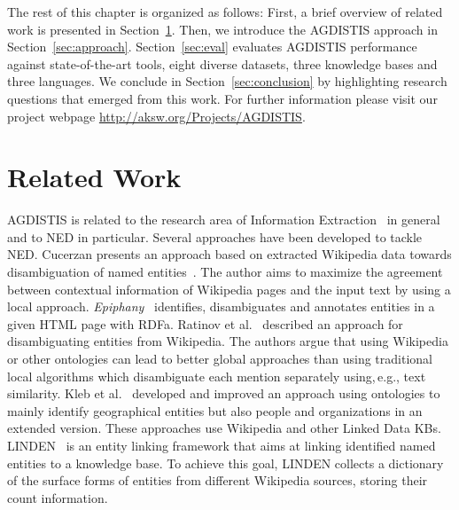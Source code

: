 The rest of this chapter is organized as follows: 
First, a brief overview of related work is presented in Section~\ref{sec:relatedwork}.
Then, we introduce the AGDISTIS approach in Section~\ref{sec:approach}. %
Section~\ref{sec:eval} evaluates AGDISTIS performance against state-of-the-art tools, eight diverse datasets, three knowledge bases and three languages. 
We conclude in Section~\ref{sec:conclusion} by highlighting research questions that emerged from this work.
For further information please visit our project webpage \url{http://aksw.org/Projects/AGDISTIS}.

\section{Related Work}
\label{sec:relatedwork}
AGDISTIS is related to the research area of Information Extraction~\cite{nad:sek} in general and to \ac{NED} in particular.
Several approaches have been developed to tackle \ac{NED}. 
Cucerzan presents an approach based on extracted Wikipedia data towards disambiguation of named entities~\cite{Cucerzan07}.
The author aims to maximize the agreement between contextual information of Wikipedia pages and the input text by using a local approach.
\emph{Epiphany}~\cite{epiphany} identifies, disambiguates and annotates entities in a given HTML page with RDFa. 
Ratinov et al.~\cite{rat:rot} described an approach for disambiguating entities from Wikipedia. 
The authors argue that using Wikipedia or other ontologies can lead to better global approaches than using traditional local algorithms which disambiguate each mention separately using,\,e.g., text similarity. %
Kleb et al.~\cite{Kleb11WIMS,KlebESWC10} developed and improved an approach using ontologies to mainly identify geographical entities but also people and organizations in an extended version. 
These approaches use Wikipedia and other Linked Data \ac{KB}s.
LINDEN~\cite{LINDEN} is an entity linking framework that aims at linking identified named entities to a knowledge base.
To achieve this goal, LINDEN collects a dictionary of the surface forms of entities from different Wikipedia sources, storing their count information.

